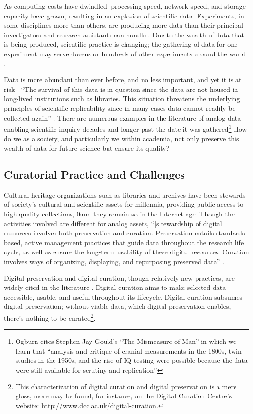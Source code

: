 \documentclass{acm_proc_article-sp}
\begin{document}
As computing costs have dwindled, processing speed, network speed, and
storage capacity have grown, resulting in an explosion of scientific
data.  Experiments, in some disciplines more than others, are
producing more data than their principal investigators and research
assistants can handle \cite{adams:galaxyzoo}. Due to the wealth of
data that is being produced, scientific practice is changing; the
gathering of data for one experiment may serve dozens or hundreds of
other experiments around the world \cite{jisc:deluge}.

Data is more abundant than ever before, and no less important, and yet
it is at risk \cite{ogburn:imperative,heidorn:libraries}.  ``The
survival of this data is in question since the data are not housed in
long-lived institutions such as libraries. This situation threatens
the underlying principles of scientific replicability since in many
cases data cannot readily be collected again''
\cite{heidorn:libraries}. There are numerous examples in the
literature of analog data enabling scientific inquiry decades and
longer past the date it was gathered\footnote{Ogburn
  \cite{ogburn:imperative} cites Stephen Jay Gould's ``The Mismeasure
  of Man'' in which we learn that ``analysis and critique of cranial
  measurements in the 1800s, twin studies in the 1950s, and the rise
  of IQ testing were possible because the data were still available
  for scrutiny and replication''} How do we as a society, and
particularly we within academia, not only preserve this wealth of data
for future science but ensure its quality?

\subsection{Curatorial Practice and Challenges}

Cultural heritage organizations such as libraries and archives have
been stewards of society's cultural and scientific assets for
millennia, providing public access to high-quality collections, 0and
they remain so in the Internet age. Though the activities involved are
different for analog assets, ``[s]tewardship of digital resources
involves both preservation and curation. Preservation entails
standards-based, active management practices that guide data
throughout the research life cycle, as well as ensure the long-term
usability of these digital resources. Curation involves ways of
organizing, displaying, and repurposing preserved data''
\cite{arl:stewardship}.

Digital preservation and digital curation, though relatively new
practices, are widely cited in the literature
\cite{jisc:deluge,curry:community,goble:curation,ogburn:imperative,heidorn:libraries,williams:lifecycle,arl:stewardship}. Digital
curation aims to make selected data accessible, usable, and useful
throughout its lifecycle. Digital curation subsumes digital
preservation; without viable data, which digital preservation enables,
there's nothing to be curated\footnote{This characterization of
  digital curation and digital preservation is a mere gloss; more may
  be found, for instance, on the Digital Curation Centre's website:
  \url{http://www.dcc.ac.uk/digital-curation}.}.
\end{document}
